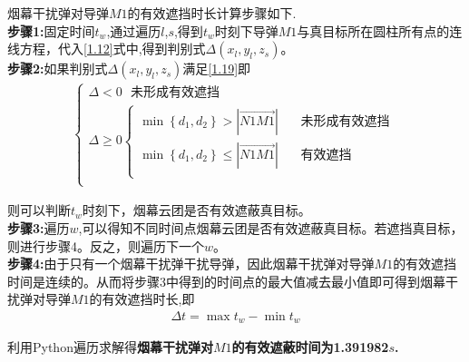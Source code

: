 \documentclass[../main.tex]{subfiles}
\begin{document}
  
烟幕干扰弹对导弹$M1$的有效遮挡时长计算步骤如下.
\\
\textbf{步骤1:}固定时间$t_w$,通过遍历$l$,$s$,得到$t_w$时刻下导弹$M1$与真目标所在圆柱所有点的连线方程，代入\eqref{1.12}式中,得到判别式$\Delta \left( x_l,y_l,z_s \right)$。
\\
\textbf{步骤2:}如果判别式$\Delta \left( x_l,y_l,z_s \right)$满足\eqref{1.19}即
\begin{align}\label{1.19}
	\left\{ \begin{array}{l}
	\varDelta <0\ \ \ \text{未形成有效遮挡}\\
	\varDelta \ge 0\left\{ \begin{array}{l}
	\min \left\{ d_1,d_2 \right\} >\left| \overrightarrow{N1M1} \right|\ \ \ \ \ \ \ \ \text{未形成有效遮挡}\\
	\min \left\{ d_1,d_2 \right\} \le \left| \overrightarrow{N1M1} \right|\ \ \ \ \ \ \ \ \text{有效遮挡}\\
\end{array} \right.\\
\end{array} \right. 
\end{align}
\par 则可以判断$t_w$时刻下，烟幕云团是否有效遮蔽真目标。
\\
\textbf{步骤3:}遍历$w$,可以得知不同时间点烟幕云团是否有效遮蔽真目标。若遮挡真目标，则进行步骤4。反之，则遍历下一个$w$。
\\
\textbf{步骤4:}由于只有一个烟幕干扰弹干扰导弹，因此烟幕干扰弹对导弹$M1$的有效遮挡时间是连续的。从而将步骤3中得到的时间点的最大值减去最小值即可得到烟幕干扰弹对导弹$M1$的有效遮挡时长,即
\begin{align}\label{1.189}
	\varDelta t=\max t_w-\min t_w
\end{align}

利用Python遍历求解得\textbf{烟幕干扰弹对$M1$的有效遮蔽时间为1.391982$s$.}
\end{document}
